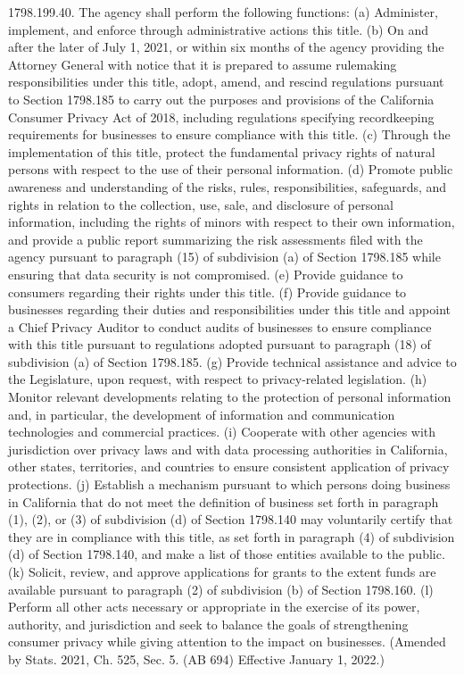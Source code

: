 1798.199.40.  The agency shall perform the following functions:
(a) Administer, implement, and enforce through administrative actions this title.
(b) On and after the later of July 1, 2021, or within six months of the agency providing the Attorney General with notice that it is prepared to assume rulemaking responsibilities under this title, adopt, amend, and rescind regulations pursuant to Section 1798.185 to carry out the purposes and provisions of the California Consumer Privacy Act of 2018, including regulations specifying recordkeeping requirements for businesses to ensure compliance with this title.
(c) Through the implementation of this title, protect the fundamental privacy rights of natural persons with respect to the use of their personal information.
(d) Promote public awareness and understanding of the risks, rules, responsibilities, safeguards, and rights in relation to the collection, use, sale, and disclosure of personal information, including the rights of minors with respect to their own information, and provide a public report summarizing the risk assessments filed with the agency pursuant to paragraph (15) of subdivision (a) of Section 1798.185 while ensuring that data security is not compromised.
(e) Provide guidance to consumers regarding their rights under this title.
(f) Provide guidance to businesses regarding their duties and responsibilities under this title and appoint a Chief Privacy Auditor to conduct audits of businesses to ensure compliance with this title pursuant to regulations adopted pursuant to paragraph (18) of subdivision (a) of Section 1798.185.
(g) Provide technical assistance and advice to the Legislature, upon request, with respect to privacy-related legislation.
(h) Monitor relevant developments relating to the protection of personal information and, in particular, the development of information and communication technologies and commercial practices.
(i) Cooperate with other agencies with jurisdiction over privacy laws and with data processing authorities in California, other states, territories, and countries to ensure consistent application of privacy protections.
(j) Establish a mechanism pursuant to which persons doing business in California that do not meet the definition of business set forth in paragraph (1), (2), or (3) of subdivision (d) of Section 1798.140 may voluntarily certify that they are in compliance with this title, as set forth in paragraph (4) of subdivision (d) of Section 1798.140, and make a list of those entities available to the public.
(k) Solicit, review, and approve applications for grants to the extent funds are available pursuant to paragraph (2) of subdivision (b) of Section 1798.160.
(l) Perform all other acts necessary or appropriate in the exercise of its power, authority, and jurisdiction and seek to balance the goals of strengthening consumer privacy while giving attention to the impact on businesses.
(Amended by Stats. 2021, Ch. 525, Sec. 5. (AB 694) Effective January 1, 2022.)

